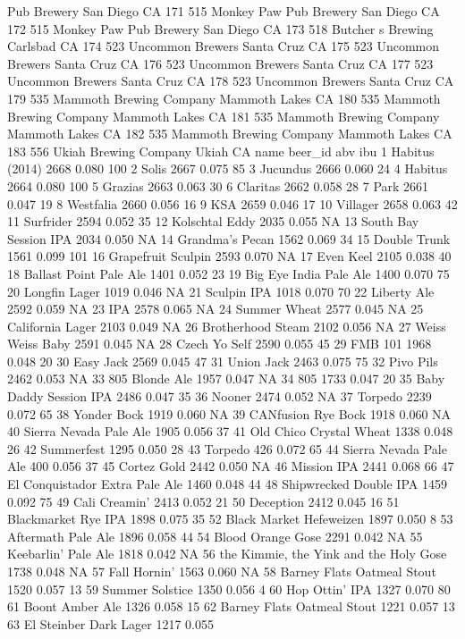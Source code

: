 \documentclass[]{article}
\begin{document}
Pub Brewery San Diego CA 171 515 Monkey Paw Pub Brewery San Diego CA 172
515 Monkey Paw Pub Brewery San Diego CA 173 518 Butcher s Brewing
Carlsbad CA 174 523 Uncommon Brewers Santa Cruz CA 175 523 Uncommon
Brewers Santa Cruz CA 176 523 Uncommon Brewers Santa Cruz CA 177 523
Uncommon Brewers Santa Cruz CA 178 523 Uncommon Brewers Santa Cruz CA
179 535 Mammoth Brewing Company Mammoth Lakes CA 180 535 Mammoth Brewing
Company Mammoth Lakes CA 181 535 Mammoth Brewing Company Mammoth Lakes
CA 182 535 Mammoth Brewing Company Mammoth Lakes CA 183 556 Ukiah
Brewing Company Ukiah CA name beer\_id abv ibu 1 Habitus (2014) 2668
0.080 100 2 Solis 2667 0.075 85 3 Jucundus 2666 0.060 24 4 Habitus 2664
0.080 100 5 Grazias 2663 0.063 30 6 Claritas 2662 0.058 28 7 Park 2661
0.047 19 8 Westfalia 2660 0.056 16 9 KSA 2659 0.046 17 10 Villager 2658
0.063 42 11 Surfrider 2594 0.052 35 12 Kolschtal Eddy 2035 0.055 NA 13
South Bay Session IPA 2034 0.050 NA 14 Grandma's Pecan 1562 0.069 34 15
Double Trunk 1561 0.099 101 16 Grapefruit Sculpin 2593 0.070 NA 17 Even
Keel 2105 0.038 40 18 Ballast Point Pale Ale 1401 0.052 23 19 Big Eye
India Pale Ale 1400 0.070 75 20 Longfin Lager 1019 0.046 NA 21 Sculpin
IPA 1018 0.070 70 22 Liberty Ale 2592 0.059 NA 23 IPA 2578 0.065 NA 24
Summer Wheat 2577 0.045 NA 25 California Lager 2103 0.049 NA 26
Brotherhood Steam 2102 0.056 NA 27 Weiss Weiss Baby 2591 0.045 NA 28
Czech Yo Self 2590 0.055 45 29 FMB 101 1968 0.048 20 30 Easy Jack 2569
0.045 47 31 Union Jack 2463 0.075 75 32 Pivo Pils 2462 0.053 NA 33 805
Blonde Ale 1957 0.047 NA 34 805 1733 0.047 20 35 Baby Daddy Session IPA
2486 0.047 35 36 Nooner 2474 0.052 NA 37 Torpedo 2239 0.072 65 38 Yonder
Bock 1919 0.060 NA 39 CANfusion Rye Bock 1918 0.060 NA 40 Sierra Nevada
Pale Ale 1905 0.056 37 41 Old Chico Crystal Wheat 1338 0.048 26 42
Summerfest 1295 0.050 28 43 Torpedo 426 0.072 65 44 Sierra Nevada Pale
Ale 400 0.056 37 45 Cortez Gold 2442 0.050 NA 46 Mission IPA 2441 0.068
66 47 El Conquistador Extra Pale Ale 1460 0.048 44 48 Shipwrecked Double
IPA 1459 0.092 75 49 Cali Creamin' 2413 0.052 21 50 Deception 2412 0.045
16 51 Blackmarket Rye IPA 1898 0.075 35 52 Black Market Hefeweizen 1897
0.050 8 53 Aftermath Pale Ale 1896 0.058 44 54 Blood Orange Gose 2291
0.042 NA 55 Keebarlin' Pale Ale 1818 0.042 NA 56 the Kimmie, the Yink
and the Holy Gose 1738 0.048 NA 57 Fall Hornin' 1563 0.060 NA 58 Barney
Flats Oatmeal Stout 1520 0.057 13 59 Summer Solstice 1350 0.056 4 60 Hop
Ottin' IPA 1327 0.070 80 61 Boont Amber Ale 1326 0.058 15 62 Barney
Flats Oatmeal Stout 1221 0.057 13 63 El Steinber Dark Lager 1217 0.055
\end{document}
